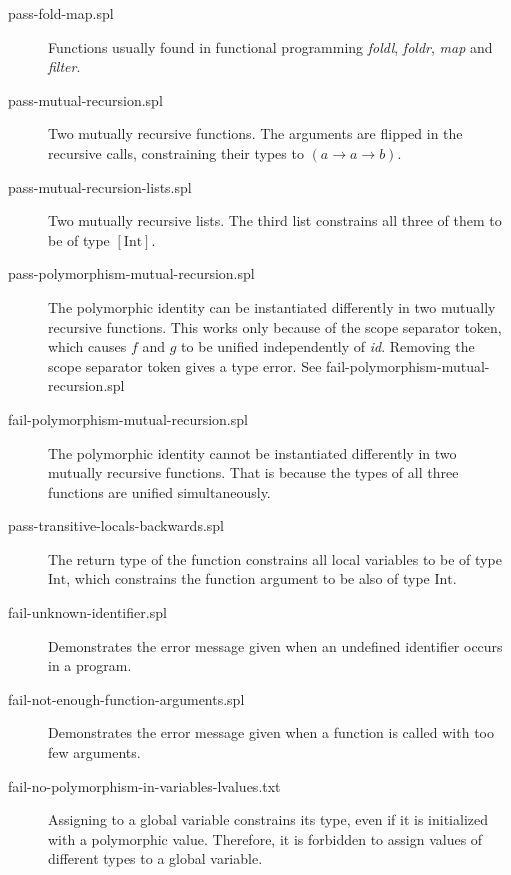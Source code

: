 \documentclass[a4paper]{article}
\newcommand{\arr}{\rightarrow}
\begin{document}
\begin{description}

  \item[pass-fold-map.spl] Functions usually found in functional programming
  \emph{foldl}, \emph{foldr}, \emph{map} and \emph{filter}.

  \item[pass-mutual-recursion.spl] Two mutually recursive functions. The
  arguments are flipped in the recursive calls, constraining their types to $(a
  \arr a \arr b)$.

  \item[pass-mutual-recursion-lists.spl] Two mutually recursive lists.  The
  third list constrains all three of them to be of type $[\text{Int}]$.

  \item[pass-polymorphism-mutual-recursion.spl] The polymorphic identity can be
  instantiated differently in two mutually recursive functions.  This works only
  because of the scope separator token, which causes $f$ and $g$ to be unified
  independently of \emph{id}.  Removing the scope separator token gives a type
  error.  See fail-polymorphism-mutual-recursion.spl

  \item[fail-polymorphism-mutual-recursion.spl] The polymorphic identity cannot
  be instantiated differently in two mutually recursive functions.  That is
  because the types of all three functions are unified simultaneously.

  \item[pass-transitive-locals-backwards.spl] The return type of the function
  constrains all local variables to be of type $\text{Int}$, which constrains
  the function argument to be also of type $\text{Int}$.

  \item[fail-unknown-identifier.spl] Demonstrates the error message given when
  an undefined identifier occurs in a program.

  \item[fail-not-enough-function-arguments.spl] Demonstrates the error message
  given when a function is called with too few arguments.

  \item[fail-no-polymorphism-in-variables-lvalues.txt] Assigning to a global
  variable constrains its type, even if it is initialized with a polymorphic
  value.  Therefore, it is forbidden to assign values of different types to a
  global variable.


\end{description}
\end{document}
